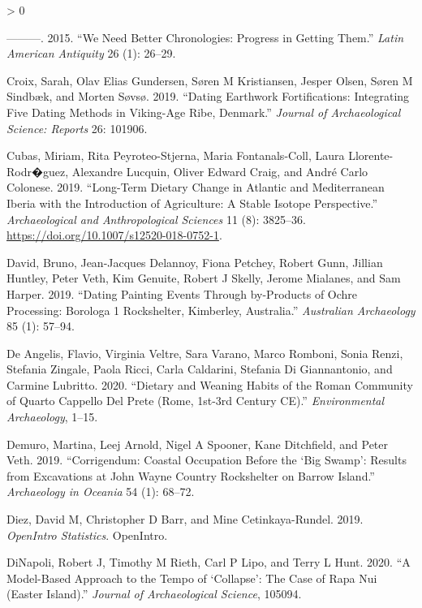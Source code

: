 \documentclass[
]{article}
\newlength{\cslhangindent}
\newenvironment{CSLReferences}[2] %
 {%
  \setlength{\parindent}{0pt}
  \ifodd #1 \everypar{\setlength{\hangindent}{\cslhangindent}}\ignorespaces\fi
  \ifnum #2 > 0
  \setlength{\parskip}{#2\baselineskip}
  \fi
 }%
 {}
\begin{document}
\begin{CSLReferences}{1}{0}
\leavevmode\hypertarget{ref-cowgill_we_2015}{}%
---------. 2015. {``We Need Better Chronologies: Progress in Getting
Them.''} \emph{Latin American Antiquity} 26 (1): 26--29.

\leavevmode\hypertarget{ref-croix_dating_2019}{}%
Croix, Sarah, Olav Elias Gundersen, Søren M Kristiansen, Jesper Olsen,
Søren M Sindbæk, and Morten Søvsø. 2019. {``Dating Earthwork
Fortifications: {Integrating} Five Dating Methods in {Viking}-Age
{Ribe}, {Denmark}.''} \emph{Journal of Archaeological Science: Reports}
26: 101906.

\leavevmode\hypertarget{ref-cubas_long-term_2019}{}%
Cubas, Miriam, Rita Peyroteo-Stjerna, Maria Fontanals-Coll, Laura
Llorente-Rodr�guez, Alexandre Lucquin, Oliver Edward Craig, and André
Carlo Colonese. 2019. {``Long-Term Dietary Change in {Atlantic} and
{Mediterranean} {Iberia} with the Introduction of Agriculture: A Stable
Isotope Perspective.''} \emph{Archaeological and Anthropological
Sciences} 11 (8): 3825--36.
\url{https://doi.org/10.1007/s12520-018-0752-1}.

\leavevmode\hypertarget{ref-david_dating_2019}{}%
David, Bruno, Jean-Jacques Delannoy, Fiona Petchey, Robert Gunn, Jillian
Huntley, Peter Veth, Kim Genuite, Robert J Skelly, Jerome Mialanes, and
Sam Harper. 2019. {``Dating Painting Events Through by-Products of Ochre
Processing: {Borologa} 1 {Rockshelter}, {Kimberley}, {Australia}.''}
\emph{Australian Archaeology} 85 (1): 57--94.

\leavevmode\hypertarget{ref-de_angelis_dietary_2020}{}%
De Angelis, Flavio, Virginia Veltre, Sara Varano, Marco Romboni, Sonia
Renzi, Stefania Zingale, Paola Ricci, Carla Caldarini, Stefania Di
Giannantonio, and Carmine Lubritto. 2020. {``Dietary and {Weaning}
{Habits} of the {Roman} {Community} of {Quarto} {Cappello} Del {Prete}
({Rome}, 1st-3rd {Century} {CE}).''} \emph{Environmental Archaeology},
1--15.

\leavevmode\hypertarget{ref-demuro_corrigendum_2019}{}%
Demuro, Martina, Leej Arnold, Nigel A Spooner, Kane Ditchfield, and
Peter Veth. 2019. {``Corrigendum: {Coastal} Occupation Before the
{`{Big} {Swamp}'}: {Results} from Excavations at {John} {Wayne}
{Country} {Rockshelter} on {Barrow} {Island}.''} \emph{Archaeology in
Oceania} 54 (1): 68--72.

\leavevmode\hypertarget{ref-diez_open_2019}{}%
Diez, David M, Christopher D Barr, and Mine Cetinkaya-Rundel. 2019.
\emph{OpenIntro Statistics}. OpenIntro.

\leavevmode\hypertarget{ref-dinapoli_model-based_2020}{}%
DiNapoli, Robert J, Timothy M Rieth, Carl P Lipo, and Terry L Hunt.
2020. {``A Model-Based Approach to the Tempo of {`Collapse'}: {The} Case
of {Rapa} {Nui} ({Easter} {Island}).''} \emph{Journal of Archaeological
Science}, 105094.


\end{CSLReferences}
\end{document}
